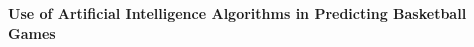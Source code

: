 \begin{center}
\textbf{Use of Artificial Intelligence Algorithms in Predicting Basketball Games\\}
\end{center}